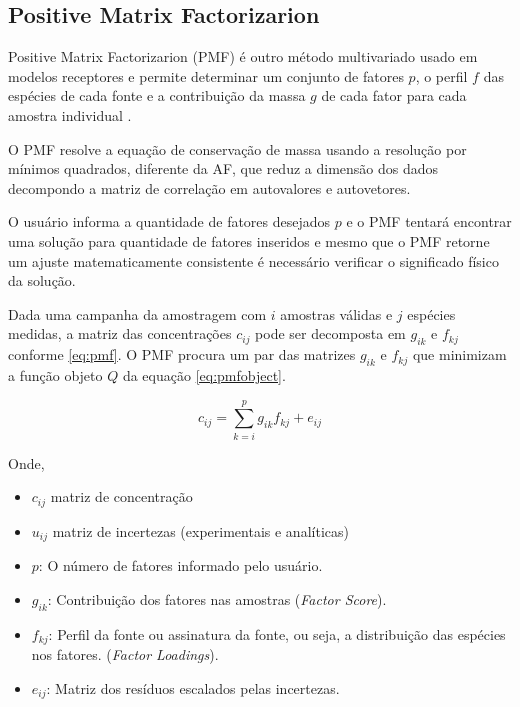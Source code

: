 
\subsection{Positive Matrix Factorizarion}

Positive Matrix Factorizarion (PMF) é outro método multivariado usado
em modelos receptores e permite determinar um conjunto de fatores $p$, 
o perfil $f$ das espécies de cada fonte e a contribuição da massa $g$ de cada fator 
para cada amostra individual \citep{norris2014}. 

O PMF resolve a equação de conservação de massa usando a resolução por 
mínimos quadrados, diferente da AF, que reduz a dimensão dos 
dados decompondo a matriz de correlação em autovalores e autovetores. 

O usuário informa a quantidade de fatores desejados $p$ e o PMF 
tentará encontrar uma solução para quantidade de fatores inseridos e 
mesmo que o PMF retorne um ajuste matematicamente consistente 
é necessário verificar o significado físico da solução.

Dada uma campanha da amostragem com $i$ amostras válidas e 
$j$ espécies medidas, a matriz das concentrações $c_{ij}$ 
pode ser decomposta em $g_{ik}$ e $f_{kj}$ conforme \ref{eq:pmf}. 
O PMF procura um par das matrizes $g_{ik}$ e $f_{kj}$ que
minimizam a função objeto $Q$ da equação \ref{eq:pmfobject}. 

\begin{equation}
  c_{ij} = \sum_{k=i}^p g_{ik}f_{kj} + e_{ij}
  \label{eq:pmf}
\end{equation}

Onde,
\begin{itemize}
  \item $c_{ij}$ matriz de concentração
  \item $u_{ij}$ matriz de incertezas (experimentais e analíticas)
  \item $p$: O número de fatores informado pelo usuário.
  \item $g_{ik}$: Contribuição dos fatores nas amostras (\textit{Factor Score}).
  \item $f_{kj}$: Perfil da fonte ou assinatura da fonte, ou seja, 
        a distribuição das espécies nos fatores. (\textit{Factor Loadings}).
  \item $e_{ij}$: Matriz dos resíduos escalados pelas incertezas.
\end{itemize}

